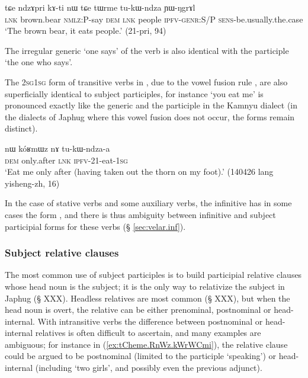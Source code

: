 \begin{exe}
\ex \label{ex:tukWndza.genr}
 \gll tɕe ndzɤpri kɤ-ti nɯ tɕe tɯrme tu-kɯ-ndza ɲɯ-ŋgrɤl  \\
 \textsc{lnk} brown.bear \textsc{nmlz}:P-say \textsc{dem} \textsc{lnk} people \textsc{ipfv}-\textsc{genr}:S/P \textsc{sens}-be.usually.the.case \\
\glt `The brown bear, it eats people.' (21-pri, 94)
\end{exe}
 
The irregular generic  `one says' of the verb  is also identical with the participle `the one who says'.

The \textsc{2sg}\fl{}\textsc{1sg} form of transitive verbs in , due to the vowel fusion rule  \fl{} , are also superficially identical to subject participles, for instance  `you eat me' is pronounced  exactly like the generic and the participle  in the Kamnyu dialect (in the dialects of Japhug where this vowel fusion does not occur, the forms remain distinct).

\begin{exe}
\ex \label{ex:tukWndzaa}
 \gll nɯ kóʁmɯz nɤ tu-kɯ-ndza-a \\
 \textsc{dem} only.after \textsc{lnk} \textsc{ipfv}-2\fl{}1-eat-\textsc{1sg} \\
 \glt `Eat me only after (having taken out the thorn on my foot).' (140426 lang yisheng-zh, 16)
\end{exe} 

In the case of stative verbs and some auxiliary verbs, the infinitive has in some cases the form , and there is thus ambiguity between infinitive and subject participial forms for these verbs (§ \ref{sec:velar.inf}).

\subsubsection{Subject relative clauses}  \label{sec:subject.participle.subject.relative}
The most common use of subject participles is to build participial relative clauses whose head noun is the subject; it is the only way to relativize the subject in Japhug (§ XXX). Headless relatives are most common (§ XXX), but when the head noun is overt, the relative can be either prenominal, postnominal or head-internal. With intransitive verbs the difference between postnominal or head-internal relatives is often difficult to ascertain, and many examples are ambiguous; for instance in (\ref{ex:tCheme.RnWz.kWrWCmi}), the relative clause could be argued to be postnominal (limited to the participle  `speaking') or head-internal (including  `two girls', and possibly even the previous adjunct).


